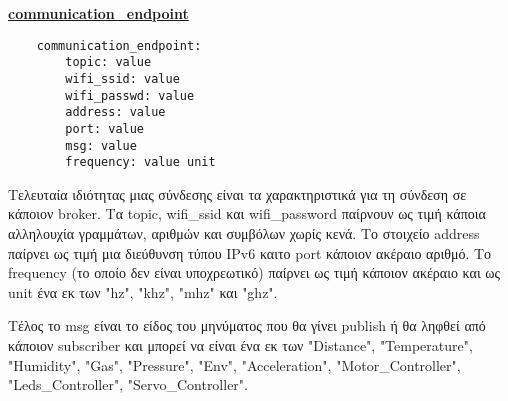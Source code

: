 \textbf{\underline{communication\_endpoint}}

\begin{lstlisting}
	communication_endpoint:
		topic: value
		wifi_ssid: value
		wifi_passwd: value
		address: value
		port: value
		msg: value
		frequency: value unit
\end{lstlisting}

Τελευταία ιδιότητας μιας σύνδεσης είναι τα χαρακτηριστικά για τη σύνδεση σε κάποιον broker. Τα topic, wifi\_ssid και wifi\_password παίρνουν ως τιμή κάποια αλληλουχία γραμμάτων, αριθμών και συμβόλων χωρίς κενά. Το στοιχείο address παίρνει ως τιμή μια διεύθυνση τύπου IPv6 καιτο port κάποιον ακέραιο αριθμό. Το frequency (το οποίο δεν είναι υποχρεωτικό) παίρνει ως τιμή κάποιον ακέραιο και ως unit ένα εκ των "hz", "khz", "mhz" και "ghz".

Τέλος το msg είναι το είδος του μηνύματος που θα γίνει publish ή θα ληφθεί από κάποιον subscriber και μπορεί να είναι ένα εκ των "Distance", "Temperature", "Humidity", "Gas", "Pressure", "Env", "Acceleration", "Motor\_Controller", "Leds\_Controller", "Servo\_Controller".